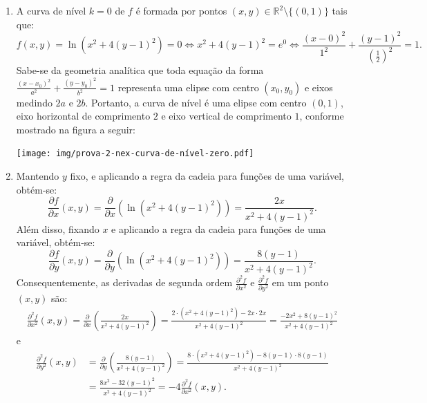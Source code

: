 \documentclass[12pt,a4paper]{article}
\begin{document}
\begin{ExerciseList}
\Answer
\begin{enumerate}
\item A curva de nível $k=0$ de $f$ é formada por pontos $(x, y) \in \mathbb{R}^2 \setminus\{(0, 1)\}$ tais que:
\[
    f(x, y) = \ln\left(x^2 + 4(y-1)^2\right) = 0
    \Leftrightarrow
    x^2 + 4(y-1)^2 = e^0
    \Leftrightarrow
    \frac{(x - 0)^2}{1^2} + \frac{(y-1)^2}{\left(\frac{1}{2}\right)^2} = 1.
\]
Sabe-se da geometria analítica que toda equação da forma $\frac{(x - x_0)^2}{a^2} + \frac{(y-y_0)^2}{b^2} = 1$ representa uma elipse com centro $(x_0, y_0)$ e eixos medindo $2a$ e $2b$. Portanto, a curva de nível é uma elipse com centro $(0, 1)$, eixo horizontal de comprimento $2$ e eixo vertical de comprimento $1$, conforme mostrado na figura a seguir:
\begin{center}
\texttt{[image: img/prova-2-nex-curva-de-nível-zero.pdf]}
\end{center}
\item Mantendo $y$ fixo, e aplicando a regra da cadeia para funções de uma variável, obtém-se:
\[
\frac{\partial f}{\partial x}(x, y)
= \frac{\partial}{\partial x}\left(\ln\left(x^2 + 4(y-1)^2\right)\right)
= \frac{2x}{x^2 + 4(y-1)^2}.
\]
Além disso, fixando $x$ e aplicando a regra da cadeia para funções de uma variável, obtém-se:
\[
\frac{\partial f}{\partial y}(x, y)
= \frac{\partial}{\partial y}\left(\ln\left(x^2 + 4(y-1)^2\right)\right)
=\frac{8(y-1)}{x^2 + 4(y-1)^2}.
\]
Consequentemente, as derivadas de segunda ordem $\frac{\partial^2 f}{\partial x^2}$ e $\frac{\partial^2 f}{\partial y^2}$ em um ponto $(x,y)$ são:
\begin{align*}
\frac{\partial^2 f}{\partial x^2}(x, y)
  = \frac{\partial}{\partial x}\left(\frac{2x}{x^2 + 4(y-1)^2}\right)
  = \frac{2\cdot(x^2 + 4(y-1)^2) - 2x \cdot 2x}{x^2 + 4(y-1)^2}
  = \frac{-2 x^2 + 8(y-1)^2}{x^2 + 4(y-1)^2}
\end{align*}
e
\begin{align*}
\frac{\partial^2 f}{\partial y^2}(x, y)
  & = \frac{\partial}{\partial y}\left(\frac{8(y-1)}{x^2 + 4(y-1)^2}\right)
    = \frac{8\cdot(x^2 + 4(y-1)^2) - 8(y-1)\cdot 8(y-1)}{x^2 + 4(y-1)^2} \\
  & = \frac{8x^2 - 32(y-1)^2}{x^2 + 4(y-1)^2}
    = -4 \frac{\partial^2 f}{\partial x^2}(x, y).
\end{align*}
\end{enumerate}



\end{ExerciseList}
\end{document}
